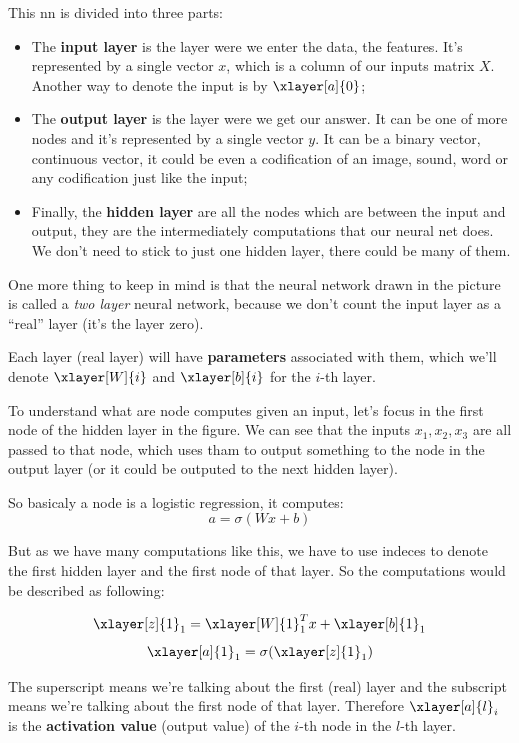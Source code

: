 \documentclass[12pt, a4paper, oneside]{book}
\begin{document}
This nn is divided into three parts:
\begin{itemize}
    \item The \textbf{input layer} is the layer were we enter the data, the
        features.  It's represented by a single vector $x$, which is a column of
        our inputs matrix $X$. Another way to denote the input is by
        $\xlayer[a]{0}$;
    \item The \textbf{output layer} is the layer were we get our answer. It can
        be one of more nodes and it's represented by a single vector $y$. It can
        be a binary vector, continuous vector, it could be even a codification
        of an image, sound, word or any codification just like the input;
    \item Finally, the \textbf{hidden layer} are all the nodes which are between
        the input and output, they are the intermediately computations that our
        neural net does. We don't need to stick to just one hidden layer, there
        could be many of them.
\end{itemize}

One more thing to keep in mind is that the neural network drawn in the picture
is called a \textit{two layer} neural network, because we don't count the input
layer as a ``real'' layer (it's the layer zero).

Each layer (real layer) will have \textbf{parameters} associated with them,
which we'll denote $\xlayer[W]{i}$ and $\xlayer[b]{i}$ for the $i$-th layer.

To understand what are node computes given an input, let's focus in the first
node of the hidden layer in the figure. We can see that the inputs $x_1,x_2,x_3$
are all passed to that node, which uses tham to output something to the node in
the output layer (or it could be outputed to the next hidden layer).

So basicaly a node is a logistic regression, it computes:
\[
    a = \sigma(Wx+b)
\]

But as we have many computations like this, we have to use indeces to denote the
first hidden layer and the first node of that layer. So the computations would
be described as following:

\[
\xlayer[z]{1}_1=\xlayer[W]{1}_1^{T}x+\xlayer[b]{1}_1
\]
\[
\xlayer[a]{1}_1=\sigma(\xlayer[z]{1}_1)
\]

The superscript means we're talking about the first (real) layer and the
subscript means we're talking about the first node of that layer. Therefore
$\xlayer[a]{l}_i$ is the \textbf{activation value} (output value) of the $i$-th
node in the $l$-th layer.
\end{document}
